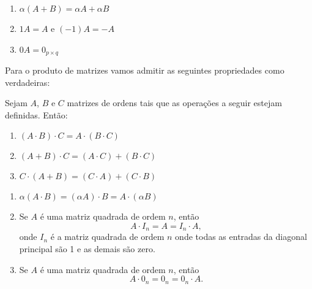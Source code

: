 \documentclass{beamer}
\begin{document}
    \begin{frame}
        \begin{proposicao}
            \begin{enumerate}[label={\roman*})]
                \conti
                \item $\alpha(A + B) =  \alpha A + \alpha B$
                \item $1A = A$ e $(-1)A = -A$
                \item  $0A = 0_{p \times q}$
            \end{enumerate}
        \end{proposicao}
    \end{frame}

    \begin{frame}
        Para o produto de matrizes vamos admitir as seguintes propriedades como verdadeiras:
        \begin{proposicao}
            Sejam $A$, $B$ e $C$  matrizes de ordens tais que as operações a seguir estejam definidas. Então:
                \begin{enumerate}[label={\roman*})]
                    \item $(A\cdot B)\cdot C = A\cdot(B \cdot C)$
                    \item $(A + B)\cdot C = (A\cdot C) + (B\cdot C)$
                    \item $C\cdot(A + B) = (C\cdot A) + (C\cdot B)$
                    \seti
                \end{enumerate}
        \end{proposicao}
    \end{frame}

    \begin{frame}
        \begin{proposicao}
            \begin{enumerate}[label={\roman*})]
                \conti
                \item $\alpha(A\cdot B) =  (\alpha A)\cdot B  = A \cdot(\alpha B)$
                \item Se $A$ é uma matriz quadrada de ordem $n$,  então \[A\cdot I_n = A = I_n\cdot A,\]  onde $I_n$ é a matriz quadrada de ordem $n$  onde todas as entradas da diagonal principal são 1  e as demais são zero.
                \item Se $A$ é uma matriz quadrada de ordem $n$,  então \[A\cdot0_n = 0_n  = 0_n\cdot A.\]
            \end{enumerate}
        \end{proposicao}
    \end{frame}
\end{document}
